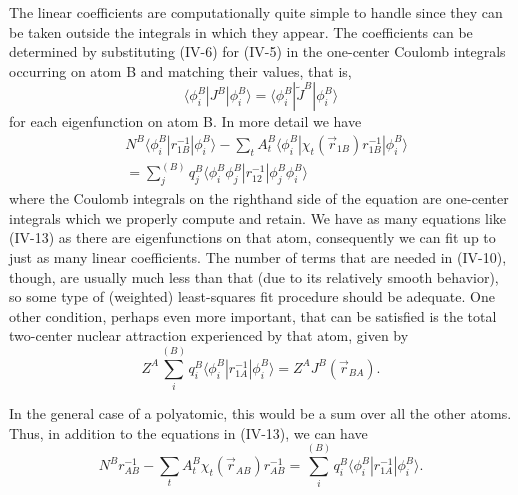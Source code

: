 \documentclass[12pt,letterpaper]{report}
\begin{document}
The linear coefficients are computationally quite simple to handle since they can be taken outside the integrals in which they appear. The coefficients can be determined by substituting (IV-6) for (IV-5) in the one-center Coulomb integrals occurring on atom B and matching their values, that is,
\begin{equation}
\langle \phi_i^B | J^B | \phi_i^B \rangle = \langle \phi_i^B | \tilde{J}^B | \phi_i^B \rangle
\end{equation}
for each eigenfunction on atom B. In more detail we have
\begin{align}
&N^B \langle \phi_i^B | r_{1B}^{-1} | \phi_i^B \rangle - \sum_t A_t^B \langle \phi_i^B | \chi_t(\vec{r}_{1B}) r_{1B}^{-1} | \phi_i^B \rangle \nonumber\\
&= \sum_j^{(B)} q_j^B \langle \phi_i^B \phi_j^B | r_{12}^{-1} | \phi_j^B \phi_i^B \rangle
\end{align}
where the Coulomb integrals on the righthand side of the equation are one-center integrals which we properly compute and retain. We have as many equations like (IV-13) as there are eigenfunctions on that atom, consequently we can fit up to just as many linear coefficients. The number of terms that are needed in (IV-10), though, are usually much less than that (due to its relatively smooth behavior), so some type of (weighted) least-squares fit procedure should be adequate. One other condition, perhaps even more important, that can be satisfied is the total two-center nuclear attraction experienced by that atom, given by
\begin{equation}
Z^A \sum_i^{(B)} q_i^B \langle \phi_i^B | r_{1A}^{-1} | \phi_i^B \rangle = Z^A J^B(\vec{r}_{BA}).
\end{equation}

In the general case of a polyatomic, this would be a sum over all the other atoms. Thus, in addition to the equations in (IV-13), we can have
\begin{equation}
N^B r_{AB}^{-1} - \sum_t A_t^B \chi_t(\vec{r}_{AB}) r_{AB}^{-1} = \sum_i^{(B)} q_i^B \langle \phi_i^B | r_{1A}^{-1} | \phi_i^B \rangle.
\end{equation}
\end{document}
